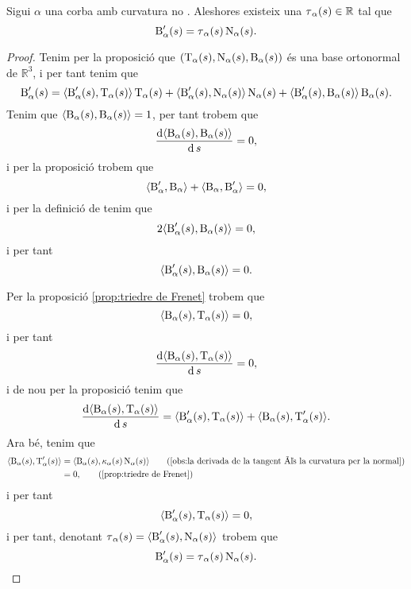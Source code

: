 \documentclass[../../Main.tex]{subfiles}
\begin{document}
	\begin{proposition}
		\label{prop:torsió}
		Sigui \(\alpha\) una corba amb curvatura no \nulla{}. Aleshores existeix una \(\operatorname{\tau}_{\alpha}(s)\in\mathbb{R}\) tal que
		\[\operatorname{B}'_{\alpha}(s)=\operatorname{\tau}_{\alpha}(s)\operatorname{N}_{\alpha}(s).\]
		\begin{proof}
			Tenim per la proposició  que \((\operatorname{T}_{\alpha}(s),\operatorname{N}_{\alpha}(s),\operatorname{B}_{\alpha}(s))\) és una base ortonormal de \(\mathbb{R}^{3}\), i per tant tenim que %
			\[\binormal'_{\alpha}(s)=\prodesc{\binormal'_{\alpha}(s)}{\tangent_{\alpha}(s)}\tangent_{\alpha}(s)+\prodesc{\binormal'_{\alpha}(s)}{\normal_{\alpha}(s)}\normal_{\alpha}(s)+\prodesc{\binormal'_{\alpha}(s)}{\binormal_{\alpha}(s)}\binormal_{\alpha}(s).\]
			Tenim que \(\prodesc{\binormal_{\alpha}(s)}{\binormal_{\alpha}(s)}=1\), per tant trobem que
			\[\frac{\diff\prodesc{\binormal_{\alpha}(s)}{\binormal_{\alpha}(s)}}{\diff s}=0,\]
			i per la proposició  trobem que
			\[\prodesc{\binormal'_{\alpha}}{\binormal_{\alpha}}+\prodesc{\binormal_{\alpha}}{\binormal'_{\alpha}}=0,\]
			i per la definició de  tenim que
			\[2\prodesc{\binormal'_{\alpha}(s)}{\binormal_{\alpha}(s)}=0,\]
			i per tant
			\[\prodesc{\binormal'_{\alpha}(s)}{\binormal_{\alpha}(s)}=0.\]
			
			Per la proposició \ref{prop:triedre de Frenet} trobem que
			\[\prodesc{\binormal_{\alpha}(s)}{\tangent_{\alpha}(s)}=0,\]
			i per tant
			\[\frac{\diff\prodesc{\binormal_{\alpha}(s)}{\tangent_{\alpha}(s)}}{\diff s}=0,\]
			i de nou per la proposició  tenim que
			\[\frac{\diff\prodesc{\binormal_{\alpha}(s)}{\tangent_{\alpha}(s)}}{\diff s}=\prodesc{\binormal'_{\alpha}(s)}{\tangent_{\alpha}(s)}+\prodesc{\binormal_{\alpha}(s)}{\tangent'_{\alpha}(s)}.\]
			Ara bé, tenim que
			\begin{align*}
				\prodesc{\binormal_{\alpha}(s)}{\tangent'_{\alpha}(s)}&=\prodesc{\binormal_{\alpha}(s)}{\curvatura_{\alpha}(s)\normal_{\alpha}(s)} \tag{\ref{obs:la derivada de la tangent és la curvatura per la normal}} \\
				&=0, \tag{\ref{prop:triedre de Frenet}}
			\end{align*}
			i per tant
			\[\prodesc{\binormal'_{\alpha}(s)}{\tangent_{\alpha}(s)}=0,\]
			i per tant, denotant \(\torsio_{\alpha}(s)=\prodesc{\binormal'_{\alpha}(s)}{\normal_{\alpha}(s)}\) trobem que
			\[\operatorname{B}'_{\alpha}(s)=\operatorname{\tau}_{\alpha}(s)\operatorname{N}_{\alpha}(s).\qedhere\]
		\end{proof}
	\end{proposition}
\end{document}
